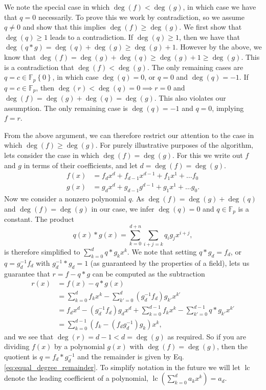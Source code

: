 \documentclass{article}
\newcommand{\set}[1]{\left\{ #1 \right\}}
\newcommand{\field}{\mathbb{F}}
\DeclareMathOperator{\lc}{lc}
\begin{document}
We note the special case in which $\deg(f) < \deg(g)$, in which case we have that $q = 0$ necessarily. To prove this we work by contradiction, so we assume $q \neq 0$ and show that this implies $\deg(f) \geq \deg(g)$. We first show that $\deg(q) \geq 1$ leads to a contradiction. If $\deg(q) \geq 1$, then we have that $\deg(q * g) = \deg(q) + \deg(g) \geq \deg(g) + 1$. However by the above, we know that $\deg(f) = \deg(g) + \deg(q) \geq \deg(g) + 1 \geq \deg(g)$. This is a contradiction that $\deg(f) < \deg(g)$. The only remaining cases are $q = c \in \field_p \set{0}$, in which case $\deg(q) = 0$, or $q = 0$ and $\deg(q) = -1$. If $q = c \in \field_p$, then $\deg(r) < \deg(q) = 0 \implies r = 0$ and $\deg(f) = \deg(g) + \deg(q) = \deg(g)$. This also violates our assumption. The only remaining case is $\deg(q) = -1$ and $q = 0$, implying $f = r$. 

From the above argument, we can therefore restrict our attention to the case in which $\deg(f) \geq \deg(g)$. For purely illustrative purposes of the algorithm, lets consider the case in which $\deg(f) = \deg(g)$. For this we write out $f$ and $g$ in terms of their coefficients, and let $d = \deg(f) = \deg(g)$. 
\begin{align}
    f(x) &= f_d x^d  + f_{d-1} x^{d-1} + f_1 x^1 + \ldots f_0 \\
    g(x) &= g_d x^d  + g_{d-1} g^{d-1} + g_1 x^1 + \ldots g_0.
\end{align}
Now we consider a nonzero polynomial $q$. As $\deg(f) = \deg(g) + \deg(q)$ and  $\deg(f) = \deg(g)$ in our case, we infer $\deg(q) = 0$ and $q \in \field_p$ is a constant. The product 
\begin{equation}
    q(x) * g(x) = \sum_{k = 0}^{d + n} \sum_{i + j = k} q_i g_j x^{i + j},
\end{equation}
is therefore simplified to $\sum_{k = 0}^{d} q * g_k x^{k}$. We note that setting $q * g_d = f_d$, or $q = g_d^{-1} f_d$ with $g_d^{-1} * g_d = 1$ (as guaranteed by the properties of a field), lets us guarantee that $r = f - q * g$ can be computed as the subtraction
\begin{align}
    r(x) &= f(x) - q * g(x) \\
    &= \sum_{k = 0}^{d} f_k x^k - \sum_{k' = 0}^d (g_d^{-1} f_d) g_{k'} x^{k'} \\
    &= f_d x^d - (g_d^{-1} f_d) g_d x^d + \sum_{k = 0}^{d - 1} f_k x^k - \sum_{k' = 0}^{d - 1} q * g_{k'} x^{k'} \\
    &= \sum_{k = 0}^{d - 1} (f_k - (f_d g_d^{-1} ) g_k) x^k, \label{eq:equal_degree_remainder}
\end{align}
and we see that $\deg(r) = d - 1 < d = \deg(g)$ as required. So if you are dividing $f(x)$ by a polynomial $g(x)$ with $\deg(f) = \deg(g)$, then the quotient is $q = f_d * g_d^{-1}$ and the remainder is given by Eq. \eqref{eq:equal_degree_remainder}. To simplify notation in the future we will let $\lc$ denote the leading coefficient of a polynomial, $\lc(\sum_{k=0}^d a_k x^k) = a_d$.
\end{document}
